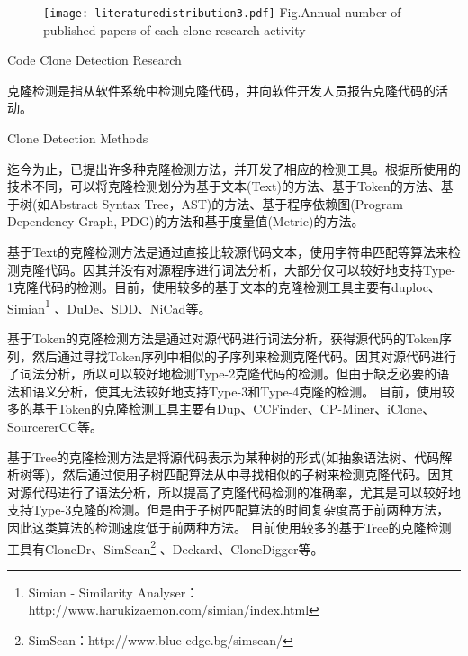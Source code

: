 \begin{figure}[htbp]
\centering
\texttt{[image: literaturedistribution3.pdf]}
{Fig.$\!$}{Annual number of published papers of each clone research activity}
\end{figure}


{Code Clone Detection Research}
\label{ref-detection}

克隆检测是指从软件系统中检测克隆代码，并向软件开发人员报告克隆代码的活动。

{Clone Detection Methods}

迄今为止，已提出许多种克隆检测方法，并开发了相应的检测工具。根据所使用的技术不同，可以将克隆检测划分为基于文本(Text)的方法、基于Token的方法、基于树(如Abstract Syntax Tree，AST)的方法、基于程序依赖图(Program Dependency Graph, PDG)的方法和基于度量值(Metric)的方法。

基于Text的克隆检测方法是通过直接比较源代码文本，使用字符串匹配等算法来检测克隆代码。因其并没有对源程序进行词法分析，大部分仅可以较好地支持Type-1克隆代码的检测。目前，使用较多的基于文本的克隆检测工具主要有duploc\cite{ducasse1999language}、Simian\footnote{Simian - Similarity Analyser：http://www.harukizaemon.com/simian/index.html}%
、DuDe\cite{wettel2005archeology}、SDD\cite{lee2005sdd}、NiCad\cite{roy2008nicad}等。

基于Token的克隆检测方法是通过对源代码进行词法分析，获得源代码的Token序列，然后通过寻找Token序列中相似的子序列来检测克隆代码。因其对源代码进行了词法分析，所以可以较好地检测Type-2克隆代码的检测。但由于缺乏必要的语法和语义分析，使其无法较好地支持Type-3和Type-4克隆的检测。
目前，使用较多的基于Token的克隆检测工具主要有Dup\cite{baker1995finding}、CCFinder\cite{kamiya2002ccfinder}、CP-Miner\cite{li2006cp}、iClone\cite{gode2009incremental}、SourcererCC\cite{sajnani2016sourcerercc}等。

基于Tree的克隆检测方法是将源代码表示为某种树的形式(如抽象语法树、代码解析树等)，然后通过使用子树匹配算法从中寻找相似的子树来检测克隆代码。因其对源代码进行了语法分析，所以提高了克隆代码检测的准确率，尤其是可以较好地支持Type-3克隆的检测。但是由于子树匹配算法的时间复杂度高于前两种方法，因此这类算法的检测速度低于前两种方法。
目前使用较多的基于Tree的克隆检测工具有CloneDr\cite{baxter1998clone}、SimScan\footnote{SimScan：http://www.blue-edge.bg/simscan/}%
、Deckard\cite{jiang2007deckard}、CloneDigger\cite{bulychev2008duplicate}等。

